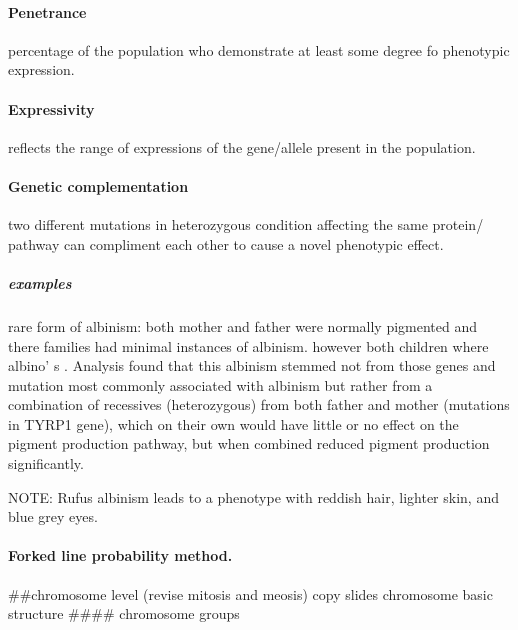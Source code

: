 \documentclass[]{article}
\let\oldparagraph\paragraph
\renewcommand{\paragraph}[1]{\oldparagraph{#1}\mbox{}}
\let\oldsubparagraph\subparagraph
\renewcommand{\subparagraph}[1]{\oldsubparagraph{#1}\mbox{}}
\begin{document}
\hypertarget{penetrance}{%
\paragraph{Penetrance}\label{penetrance}}

percentage of the population who demonstrate at least some degree fo
phenotypic expression.

\hypertarget{expressivity}{%
\paragraph{Expressivity}\label{expressivity}}

reflects the range of expressions of the gene/allele present in the
population.

\hypertarget{genetic-complementation}{%
\paragraph{Genetic complementation}\label{genetic-complementation}}

two different mutations in heterozygous condition affecting the same
protein/ pathway can compliment each other to cause a novel phenotypic
effect.

\hypertarget{examples-1}{%
\subparagraph{examples}\label{examples-1}}

rare form of albinism: both mother and father were normally pigmented
and there families had minimal instances of albinism. however both
children where albino' s . Analysis found that this albinism stemmed not
from those genes and mutation most commonly associated with albinism but
rather from a combination of recessives (heterozygous) from both father
and mother (mutations in TYRP1 gene), which on their own would have
little or no effect on the pigment production pathway, but when combined
reduced pigment production significantly.

NOTE: Rufus albinism leads to a phenotype with reddish hair, lighter
skin, and blue grey eyes.

\hypertarget{forked-line-probability-method.}{%
\paragraph{Forked line probability
method.}\label{forked-line-probability-method.}}

\#\#chromosome level (revise mitosis and meosis) copy slides chromosome
basic structure \#\#\#\# chromosome groups
\end{document}
